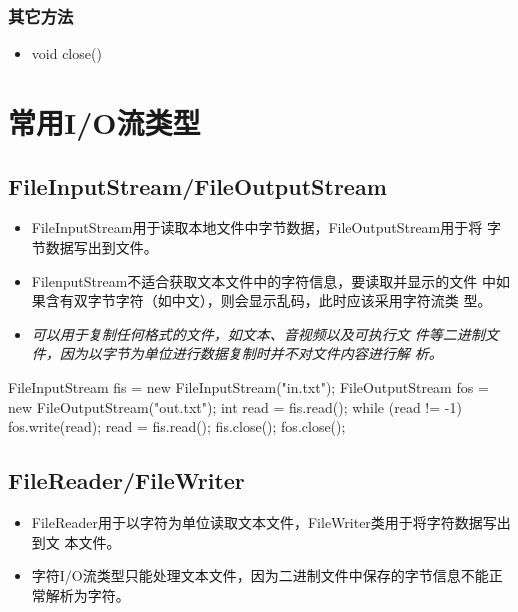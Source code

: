 \subsubsection{其它方法}

\begin{itemize}
\item void close()
\end{itemize}

\section{常用I/O流类型}

\subsection{FileInputStream/FileOutputStream}

\begin{itemize}
\item FileInputStream用于读取本地文件中字节数据，FileOutputStream用于将
  字节数据写出到文件。
\item FilenputStream不适合获取文本文件中的字符信息，要读取并显示的文件
  中如果含有双字节字符（如中文），则会显示乱码，此时应该采用字符流类
  型。
\item {\Red \it 可以用于复制任何格式的文件，如文本、音视频以及可执行文
    件等二进制文件，因为以字节为单位进行数据复制时并不对文件内容进行解
    析。}
\end{itemize}


\begin{javaCode}
  FileInputStream fis = new FileInputStream("in.txt");
  FileOutputStream fos = new FileOutputStream("out.txt");
  int read = fis.read();
  while (read != -1) {
    fos.write(read);
    read = fis.read();
  } 
  fis.close();
  fos.close();
\end{javaCode}

\subsection{FileReader/FileWriter}

\begin{itemize}
\item FileReader用于以{\hei 字符}为单位读取文本文件，FileWriter类用于将字符数据写出到文
  本文件。
\item 字符I/O流类型只能处理文本文件，因为二进制文件中保存的字节信息不能正常解析为字符。
\end{itemize}


